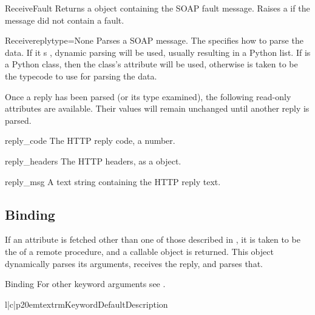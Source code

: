 \begin{methoddesc}{ReceiveFault}{}
Returns a  object containing the SOAP fault message.
Raises a  if the message did not contain a fault.
\end{methoddesc}

\begin{methoddesc}{Receive}{replytype=None}
Parses a SOAP message.
The  specifies how to parse the data.
If it s , dynamic parsing will be used, usually resulting
in a Python list.
If  is a Python class, then the class's 
attribute will be used, otherwise  is taken to be
the typecode to use for parsing the data.
\end{methoddesc}

Once a reply has been parsed (or its type examined), the following
read-only attributes are available.
Their values will remain unchanged until another reply is parsed.

\begin{memberdesc}{reply_code}
The HTTP reply code, a number.
\end{memberdesc}

\begin{memberdesc}{reply_headers}
The HTTP headers, as a  object.
\end{memberdesc}

\begin{memberdesc}{reply_msg}
A text string containing the HTTP reply text.
\end{memberdesc}

\subsection{Binding}
If an attribute is fetched other than one of those described in
, it is taken to be the  of a remote procedure, and
a callable object is returned.  This object dynamically parses its arguments,
receives the reply, and parses that.

\begin{classdesc}{Binding}{}
For other keyword arguments see .
\begin{tableiii}{l|c|p{20em}}{textrm}{Keyword}{Default}{Description}
\end{tableiii}
\end{classdesc}

